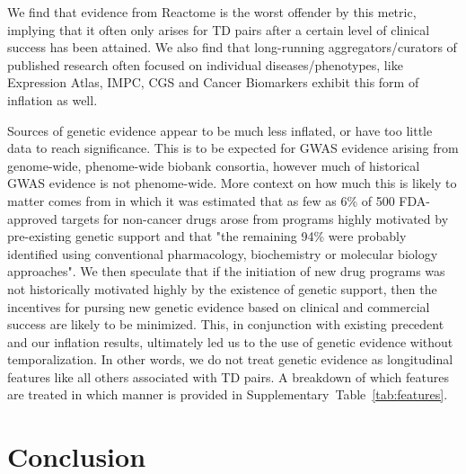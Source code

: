 \documentclass{article}
\begin{document}
We find that evidence from Reactome is the worst offender by this metric, implying that it often only arises for TD pairs after a certain level of clinical success has been attained. We also find that long-running aggregators/curators of published research often focused on individual diseases/phenotypes, like Expression Atlas, IMPC, CGS and Cancer Biomarkers exhibit this form of inflation as well.

Sources of genetic evidence appear to be much less inflated, or have too little data to reach significance. This is to be expected for GWAS evidence arising from genome-wide, phenome-wide biobank consortia, however much of historical GWAS evidence is not phenome-wide. More context on how much this is likely to matter comes from \cite{PMID:37612393} in which it was estimated that as few as 6\% of 500 FDA-approved targets for non-cancer drugs arose from programs highly motivated by pre-existing genetic support and that "the remaining 94\% were probably identified using conventional pharmacology, biochemistry or molecular biology approaches". We then speculate that if the initiation of new drug programs was not historically motivated highly by the existence of genetic support, then the incentives for pursing new genetic evidence based on clinical and commercial success are likely to be minimized. This, in conjunction with existing precedent \cite{Nelson2015-eg,King2019-rc,Minikel2023.06.23.23291765,Razuvayevskaya2023.02.07.23285407,PMID:30652614,PMID:35804044} and our inflation results, ultimately led us to the use of genetic evidence without temporalization. In other words, we do not treat genetic evidence as longitudinal features like all others associated with TD pairs. A breakdown of which features are treated in which manner is provided in Supplementary~Table~\ref{tab:features}.

\section{Conclusion}
\end{document}
